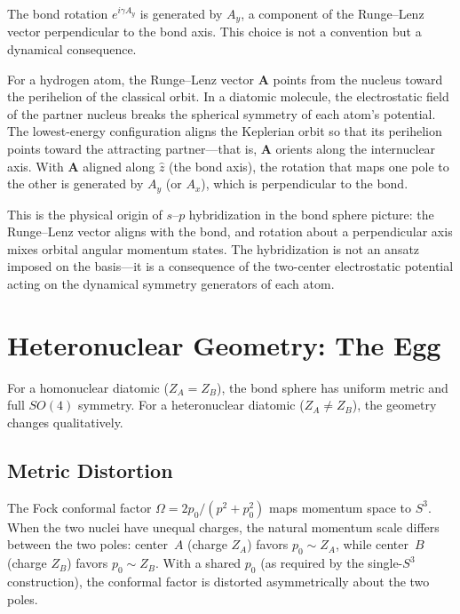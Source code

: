\documentclass[aps,pra,twocolumn,superscriptaddress,longbibliography]{revtex4-2}
\begin{document}
The bond rotation $e^{i\gamma A_y}$ is generated by $A_y$, a component
of the Runge--Lenz vector perpendicular to the bond axis.  This choice
is not a convention but a dynamical consequence.

For a hydrogen atom, the Runge--Lenz vector $\mathbf{A}$ points from
the nucleus toward the perihelion of the classical orbit.  In a
diatomic molecule, the electrostatic field of the partner nucleus
breaks the spherical symmetry of each atom's potential.  The lowest-energy
configuration aligns the Keplerian orbit so that its perihelion points
toward the attracting partner---that is, $\mathbf{A}$ orients along
the internuclear axis.  With $\mathbf{A}$ aligned along $\hat{z}$ (the
bond axis), the rotation that maps one pole to the other is generated
by $A_y$ (or $A_x$), which is perpendicular to the bond.

This is the physical origin of $s$--$p$ hybridization in the bond sphere
picture: the Runge--Lenz vector aligns with the bond, and rotation about
a perpendicular axis mixes orbital angular momentum states.  The
hybridization is not an ansatz imposed on the basis---it is a consequence
of the two-center electrostatic potential acting on the dynamical
symmetry generators of each atom.


\section{Heteronuclear Geometry: The Egg}
\label{sec:heteronuclear}

For a homonuclear diatomic ($Z_A = Z_B$), the bond sphere has uniform
metric and full $SO(4)$ symmetry.  For a heteronuclear diatomic
($Z_A \neq Z_B$), the geometry changes qualitatively.

\subsection{Metric Distortion}

The Fock conformal factor $\Omega = 2p_0/(p^2 + p_0^2)$ maps
momentum space to $S^3$.  When the two nuclei have unequal charges,
the natural momentum scale differs between the two poles: center~$A$
(charge $Z_A$) favors $p_0 \sim Z_A$, while center~$B$ (charge $Z_B$)
favors $p_0 \sim Z_B$.  With a shared $p_0$ (as required by the
single-$S^3$ construction), the conformal factor is distorted
asymmetrically about the two poles.
\end{document}
